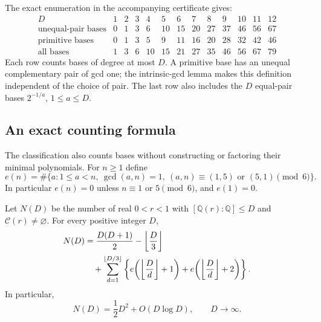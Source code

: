 The exact enumeration in the accompanying certificate gives:
\[
\begin{array}{c|rrrrrrrrrrrr}
D&1&2&3&4&5&6&7&8&9&10&11&12\\\hline
\text{unequal-pair bases}&0&1&3&6&10&15&20&27&37&46&56&67\\
\text{primitive bases}&0&1&3&5&9&11&16&20&28&32&42&46\\
\text{all bases}&1&3&6&10&15&21&27&35&46&56&67&79
\end{array}
\]
Each row counts bases of degree at most $D$.  A primitive base has
an unequal complementary pair of gcd one; the intrinsic-gcd lemma
makes this definition independent of the choice of pair.
The last row also includes the $D$ equal-pair bases $2^{-1/a}$,
$1\le a\le D$.

\subsection{An exact counting formula}

The classification also counts bases without constructing or factoring
their minimal polynomials.  For $n\ge1$ define
\[
e(n)=\#\{a:1\le a<n,\ \gcd(a,n)=1,
            \ (a,n)\equiv(1,5)\text{ or }(5,1)\pmod6\}.
\]
In particular $e(n)=0$ unless $n\equiv1$ or $5\pmod6$,
and $e(1)=0$.

\begin{corollary}
\label{cor:base-count}
Let $N(D)$ be the number of real $0<r<1$ with
$[\mathbb Q(r):\mathbb Q]\le D$ and $\mathcal C(r)\ne\varnothing$.
For every positive integer $D$,
\begin{align}
N(D)&=\frac{D(D+1)}2-\left\lfloor\frac D3\right\rfloor\notag\\
&\quad+\sum_{d=1}^{\lfloor D/3\rfloor}
\left\{e\!\left(\left\lfloor\frac Dd\right\rfloor+1\right)
       +e\!\left(\left\lfloor\frac Dd\right\rfloor+2\right)\right\}.
\label{eq:exact-base-count}
\end{align}
In particular,
\[
N(D)=\frac12D^2+O(D\log D),\qquad D\longrightarrow\infty.
\]
\end{corollary}

